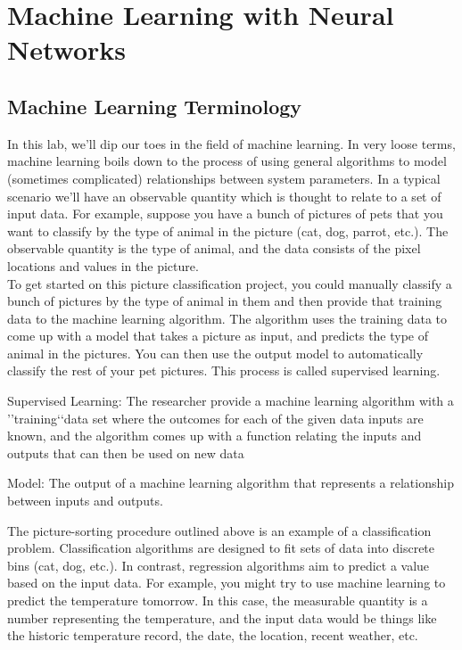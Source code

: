 \documentclass{book}
\theoremstyle{plain}
\theoremstyle{definition}
\numberwithin{exm}{chapter}
\theoremstyle{remark}
\theoremstyle{summary}
\theoremstyle{overview}
\begin{document}
\chapter*{Machine Learning with Neural Networks}

\section*{Machine Learning Terminology}
In this lab, we\rq ll dip our toes in the field of machine learning. In very loose terms, machine learning boils down to the process of using general algorithms to model (sometimes complicated) relationships between system parameters. In a typical scenario we\rq ll have an observable quantity which is thought to relate to a set of input data. For example, suppose you have a bunch of pictures of pets that you want to classify by the type of animal in the picture (cat, dog, parrot, etc.). The observable quantity is the type of animal, and the data consists of the pixel locations and values in the picture.\\

To get started on this picture classification project, you could manually classify a bunch of pictures by the type of animal in them and then provide that training data to the machine learning algorithm. The algorithm uses the training data to come up with a model that takes a picture as input, and predicts the type of animal in the pictures. You can then use the output model to automatically classify the rest of your pet pictures. This process is called supervised learning.

Supervised Learning: The researcher provide a machine learning algorithm with a \rq\rq training\lq\lq data set where the outcomes for each of the given data inputs are known, and the algorithm comes up with a function relating the inputs and outputs that can then be used on new data

Model: The output of a machine learning algorithm that represents a relationship between inputs and outputs.

The picture-sorting procedure outlined above is an example of a classification problem. Classification algorithms are designed to fit sets of data into discrete bins (cat, dog, etc.). In contrast, regression algorithms aim to predict a value based on the input data. For example, you might try to use machine learning to predict the temperature tomorrow. In this case, the measurable quantity is a number representing the temperature, and the input data would be things like the historic temperature record, the date, the location, recent weather, etc.
\end{document}
